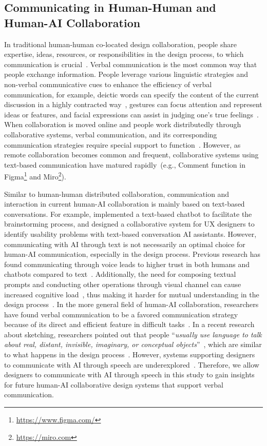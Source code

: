 \subsection{Communicating in Human-Human and Human-AI Collaboration}
In traditional human-human co-located design collaboration, people share expertise, ideas, resources, or responsibilities in the design process, to which communication is crucial~\cite{Chiu2002187an}. Verbal communication is the most common way that people exchange information. People leverage various linguistic strategies and non-verbal communicative cues to enhance the efficiency of verbal communication, for example, deictic words can specify the content of the current discussion in a highly contracted way~\cite{Tory2008deictic}, gestures can focus attention and represent ideas or features, and facial expressions can assist in judging one's true feelings~\cite{Ge2021emotion}. When collaboration is moved online and people work distributedly through collaborative systems, verbal communication, and its corresponding communication strategies require special support to function~\cite{Gutwin2002descriptive}. However, as remote collaboration becomes common and frequent, collaborative systems using text-based communication have matured rapidly~(e.g., Comment function in Figma\footnote{\url{https://www.figma.com/}} and Miro\footnote{\url{https://miro.com}}).

Similar to human-human distributed collaboration, communication and interaction in current human-AI collaboration is mainly based on text-based conversations. For example, \citet{muller2024group} implemented a text-based chatbot to facilitate the brainstorming process, and \citet{Kuang2024UX} designed a collaborative system for UX designers to identify usability problems with text-based conversation AI assistants. However, communicating with AI through text is not necessarily an optimal choice for human-AI communication, especially in the design process. Previous research has found communicating through voice leads to higher trust in both humans and chatbots compared to text~\cite{Burri2018, Bente2008Networking}. Additionally, the need for composing textual prompts and conducting other operations through visual channel can cause increased cognitive load~\cite{Tankelevitch2024Metacognitive, Vermeulen2008Sensory}, thus making it harder for mutual understanding in the design process~\cite{Gmeiner2023Exploring}. In the more general field of human-AI collaboration, researchers have found verbal communication to be a favored communication strategy because of its direct and efficient feature in difficult tasks~\cite{Zhang2021ideal}. In a recent research about sketching, researchers pointed out that people ``\textit{usually use language to talk about real, distant, invisible, imaginary, or conceptual objects}''~\cite[p.~4-5]{Rosenberg2024DrawTalking}, which are similar to what happens in the design process~\cite{Kokotovich2016abstraction, Ungureanu2021Analysing}. However, systems supporting designers to communicate with AI through speech are underexplored~\cite{Rezwana2023COFI, Shi2023Understanding}. Therefore, we allow designers to communicate with AI through speech in this study to gain insights for future human-AI collaborative design systems that support verbal communication.

